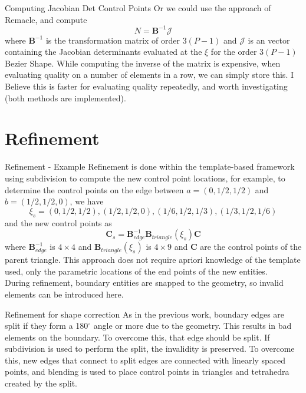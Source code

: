\documentclass[12pt]{beamer}
\newcommand{\spa}{\vspace{0.5cm}\newline}
\begin{document}
\begin{frame}{Computing Jacobian Det Control Points}
Or we could use the approach of Remacle, and compute
\[
N = \mathbf{B}^{-1}\mathcal{J}
\]
where $\mathbf{B}^{-1}$ is the transformation matrix of order $3(P-1)$ and $\mathcal{J}$ is an vector containing the Jacobian determinants evaluated at the $\xi$ for the order $3(P-1)$ Bezier Shape. While computing the inverse of the matrix is expensive, when evaluating quality on a number of elements in a row, we can simply store this. I Believe this is faster for evaluating quality repeatedly, and worth investigating (both methods are implemented). 

\end{frame}
\section{Refinement}
\begin{frame}{Refinement - Example}
Refinement is done within the template-based framework using subdivision to compute the new control point locations, for example, to determine the control points on the edge between $a = (0,1/2,1/2)$ and $b = (1/2,1/2,0)$, we have \[\xi_s = (0,1/2,1/2), (1/2,1/2,0), (1/6,1/2,1/3), (1/3,1/2,1/6) \]
and the new control points as
\[ \mathbf{C}_s = \mathbf{B}^{-1}_{edge}\mathbf{B}_{triangle}(\xi_s) \mathbf{C} \]
where $\mathbf{B}_{edge}^{-1}$ is $4 \times 4$ and $\mathbf{B}_{triangle}(\xi_s)$ is $4 \times 9$ and $\mathbf{C}$ are the control points of the parent triangle. \spa
This approach does not require apriori knowledge of the template used, only the parametric locations of the end points of the new entities. \\
During refinement, boundary entities are snapped to the geometry, so invalid elements can be introduced here.
\end{frame}
\begin{frame}{Refinement for shape correction}
As in the previous work, boundary edges are split if they form a 180$^\circ$ angle or more due to the geometry. This results in bad elements on the boundary. To overcome this, that edge should be split. If subdivision is used to perform the split, the invalidity is preserved. \spa To overcome this, new edges that connect to split edges are connected with linearly spaced points, and blending is used to place control points in triangles and tetrahedra created by the split.

\end{frame}
\end{document}
